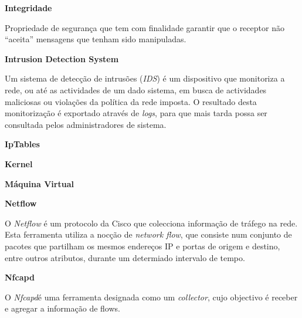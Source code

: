 \begin{description}
    \item \textbf{Integridade}

    Propriedade de segurança que tem com finalidade garantir que o receptor não “aceita” mensagens que tenham sido manipuladas.
\end{description}

\begin{description}
    \item \textbf{Intrusion Detection System}
    
    Um sistema de detecção de intrusões (\textit{IDS}) é um dispositivo que monitoriza a rede, ou até as actividades de um dado sistema, em busca de actividades maliciosas ou violações da política da rede imposta. O resultado desta monitorização é exportado através de \textit{logs}, para que mais tarda possa ser consultada pelos administradores de sistema.
\end{description}

\begin{description}
    \item \textbf{IpTables}
\end{description}

\begin{description}
    \item \textbf{Kernel}
\end{description}

\begin{description}
    \item \textbf{Máquina Virtual}
\end{description}

\begin{description}
    \item \textbf{Netflow}

O \textit{Netflow} é um protocolo da Cisco que colecciona informação de tráfego na rede. Esta ferramenta utiliza a nocção de \textit{network flow}, que consiste num conjunto de pacotes que partilham os mesmos endereços IP e portas de origem e destino, entre outros atributos, durante um determiado intervalo de tempo. 
\end{description}

\begin{description}
    \item \textbf{Nfcapd}

O \textit{Nfcapd}é uma ferramenta designada como um \textit{collector}, cujo objectivo é receber e agregar a informação de flows.
\end{description}

